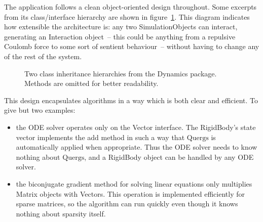 The application follows a clean object-oriented design throughout. Some excerpts from its
class/interface hierarchy are shown in figure~\ref{classHierarchy}. This diagram indicates how
extensible the architecture is: any two \textsf{SimulationObject}s can interact, generating an
\textsf{Interaction} object~-- this could be anything from a repulsive Coulomb force to some
sort of sentient behaviour~-- without having to change any of the rest of the system.

\begin{figure}
\centerline{}
\caption{Two class inheritance hierarchies from the Dynamics package. Methods are omitted for
    better readability.\label{classHierarchy}}
\end{figure}

This design encapsulates algorithms in a way which is both clear and efficient. To give but two
examples:
\begin{itemize}
\item the ODE solver operates only on the \textsf{Vector} interface. The \textsf{RigidBody}'s
    state vector implements the \textsf{add} method in such a way that $\mathrm{Quergs}$ is
    automatically applied when appropriate. Thus the ODE solver needs to know nothing about
    $\mathrm{Quergs}$, and a \textsf{RigidBody} object can be handled by any ODE solver.
\item the biconjugate gradient method for solving linear equations only multiplies \textsf{Matrix}
    objects with \textsf{Vector}s. This operation is implemented efficiently for sparse matrices,
    so the algorithm can run quickly even though it knows nothing about sparsity itself.
\end{itemize}


